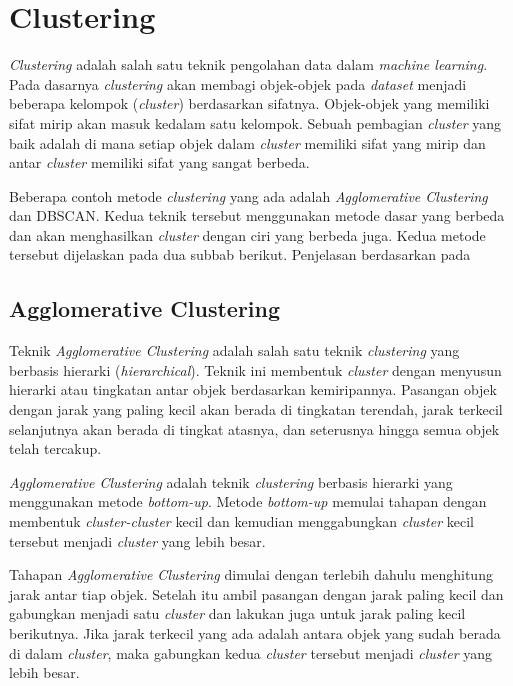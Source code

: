 \section{Clustering}
\label{sec:clustering}
\textit{Clustering} adalah salah satu teknik pengolahan data dalam \textit{machine learning}. Pada dasarnya \textit{clustering} akan membagi objek-objek pada \textit{dataset}  menjadi beberapa kelompok (\textit{cluster}) berdasarkan sifatnya. Objek-objek yang memiliki sifat mirip akan masuk kedalam satu kelompok. Sebuah pembagian \textit{cluster} yang baik adalah di mana setiap objek dalam \textit{cluster} memiliki sifat yang mirip dan antar \textit{cluster} memiliki sifat yang sangat berbeda.

Beberapa contoh metode \textit{clustering} yang ada adalah \textit{Agglomerative Clustering} dan DBSCAN. Kedua teknik tersebut menggunakan metode dasar yang berbeda dan akan menghasilkan \textit{cluster} dengan ciri yang berbeda juga. Kedua metode tersebut dijelaskan pada dua subbab berikut. Penjelasan berdasarkan pada~\cite{han2011data}

\subsection{Agglomerative Clustering}
\label{subsec:clustering_agglomerative}
Teknik \textit{Agglomerative Clustering} adalah salah satu teknik \textit{clustering} yang berbasis hierarki (\textit{hierarchical}). Teknik ini membentuk \textit{cluster} dengan menyusun hierarki atau tingkatan antar objek berdasarkan kemiripannya. Pasangan objek dengan jarak yang paling kecil akan berada di tingkatan terendah, jarak terkecil selanjutnya akan berada di tingkat atasnya, dan seterusnya hingga semua objek telah tercakup. 

\textit{Agglomerative Clustering} adalah teknik \textit{clustering} berbasis hierarki yang menggunakan metode \textit{bottom-up}. Metode \textit{bottom-up} memulai tahapan dengan membentuk \textit{cluster-cluster} kecil dan kemudian menggabungkan \textit{cluster} kecil tersebut menjadi \textit{cluster} yang lebih besar.

Tahapan \textit{Agglomerative Clustering} dimulai dengan terlebih dahulu menghitung jarak antar tiap objek. Setelah itu ambil pasangan dengan jarak paling kecil dan gabungkan menjadi satu \textit{cluster} dan lakukan juga untuk jarak paling kecil berikutnya. Jika jarak terkecil yang ada adalah antara objek yang sudah berada di dalam \textit{cluster}, maka gabungkan kedua \textit{cluster} tersebut menjadi \textit{cluster} yang lebih besar. 

